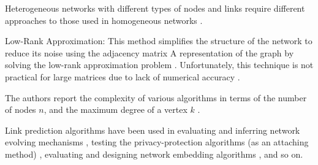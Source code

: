Heterogeneous networks with different types of nodes and links require different approaches to those used in homogeneous networks \cite{sun2012will}.

Low-Rank Approximation: This method simplifies the structure of the network to reduce its noise using the adjacency matrix A representation of the graph by solving the low-rank approximation problem \cite{kunegis2009learning}. Unfortunately, this technique is not practical for large matrices due to lack of numerical accuracy \cite{martinez2016survey}.

The authors report the complexity of various algorithms in terms of the number of nodes $n$, and the maximum degree of a vertex $k$ \cite{martinez2016survey}.






\cite{zhou2021progresses}

Link prediction algorithms have been used in evaluating and inferring network evolving mechanisms \cite{wang2012evaluating, zhang2015measuring, zhang2017uncovering}, testing the privacy-protection algorithms (as an attaching method) \cite{xian2021towards}, evaluating and designing network embedding algorithms \cite{dehghan2022evaluating, gu2021learning}, and so on.
